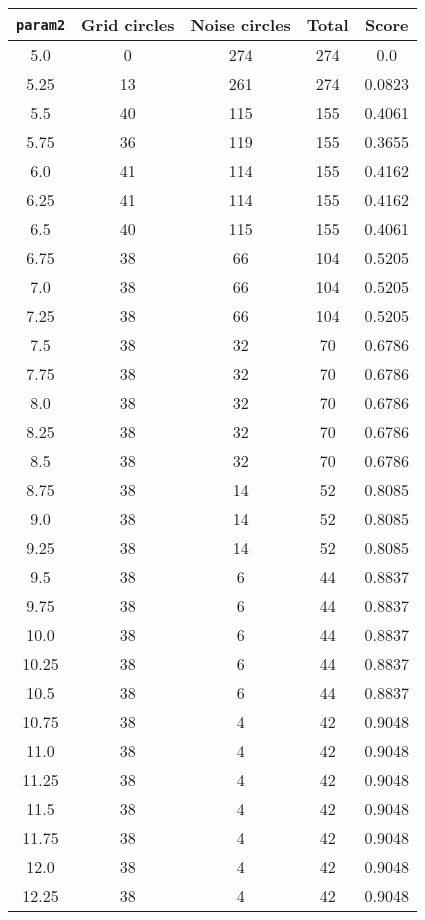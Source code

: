 \documentclass[letterpaper, 12pt]{article}
\begin{document}
\begin{longtable}{|c|c|c|c|c|}
\hline
\textbf{\texttt{param2}} & \textbf{Grid circles} & \textbf{Noise circles} & \textbf{Total} & \textbf{Score} \\
\hline
5.0 & 0 & 274 & 274 & 0.0 \\
\hline
5.25 & 13 & 261 & 274 & 0.0823 \\
\hline
5.5 & 40 & 115 & 155 & 0.4061 \\
\hline
5.75 & 36 & 119 & 155 & 0.3655 \\
\hline
6.0 & 41 & 114 & 155 & 0.4162 \\
\hline
6.25 & 41 & 114 & 155 & 0.4162 \\
\hline
6.5 & 40 & 115 & 155 & 0.4061 \\
\hline
6.75 & 38 & 66 & 104 & 0.5205 \\
\hline
7.0 & 38 & 66 & 104 & 0.5205 \\
\hline
7.25 & 38 & 66 & 104 & 0.5205 \\
\hline
7.5 & 38 & 32 & 70 & 0.6786 \\
\hline
7.75 & 38 & 32 & 70 & 0.6786 \\
\hline
8.0 & 38 & 32 & 70 & 0.6786 \\
\hline
8.25 & 38 & 32 & 70 & 0.6786 \\
\hline
8.5 & 38 & 32 & 70 & 0.6786 \\
\hline
8.75 & 38 & 14 & 52 & 0.8085 \\
\hline
9.0 & 38 & 14 & 52 & 0.8085 \\
\hline
9.25 & 38 & 14 & 52 & 0.8085 \\
\hline
9.5 & 38 & 6 & 44 & 0.8837 \\
\hline
9.75 & 38 & 6 & 44 & 0.8837 \\
\hline
10.0 & 38 & 6 & 44 & 0.8837 \\
\hline
10.25 & 38 & 6 & 44 & 0.8837 \\
\hline
10.5 & 38 & 6 & 44 & 0.8837 \\
\hline
10.75 & 38 & 4 & 42 & 0.9048 \\
\hline
11.0 & 38 & 4 & 42 & 0.9048 \\
\hline
11.25 & 38 & 4 & 42 & 0.9048 \\
\hline
11.5 & 38 & 4 & 42 & 0.9048 \\
\hline
11.75 & 38 & 4 & 42 & 0.9048 \\
\hline
12.0 & 38 & 4 & 42 & 0.9048 \\
\hline
12.25 & 38 & 4 & 42 & 0.9048 \\
\hline

\end{longtable}
\end{document}
